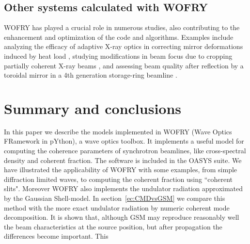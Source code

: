 \documentclass{iopconfser}
\newcommand{\todo}[1]{{\color{red}[TODO: "#1'']}}
\begin{document}



\subsection{Other systems calculated with WOFRY}

WOFRY has played a crucial role in numerous studies, also contributing to the enhancement and optimization of the code and algorithms. Examples include analyzing the efficacy of adaptive X-ray optics in correcting mirror deformations induced by heat load \cite{SanchezdelRio2020}, studying modifications in beam focus due to cropping partially coherent X-ray beams \cite{SanchezdelRio2022EPL}, and assessing beam quality after reflection by a toroidal mirror in a 4th generation storage-ring beamline \cite{ReyesHerrera2023}.

\section{Summary and conclusions}
\label{sec:summary}
In this paper we describe the models implemented in WOFRY (Wave Optics FRamework in pYthon), a wave optics toolbox. It implements a useful model for computing the coherence parameters of synchrotron beamlines, like cross-spectral density and coherent fraction. The software is included in the OASYS\cite{OASYS} suite. We have illustrated the applicability of WOFRY with some examples, from simple diffraction limited waves, to computing the coherent fraction using ``coherent slits". Moreover WOFRY also implements the undulator radiation approximated by the Gaussian Shell-model. In section~\ref{ec:CMDvsGSM} we compare this method with the more exact undulator radiation by numeric coherent mode decomposition. It is shown that, although GSM may reproduce reasonably well the beam characteristics at the source position, but after propagation the differences become important. This 









% 


\end{document}
